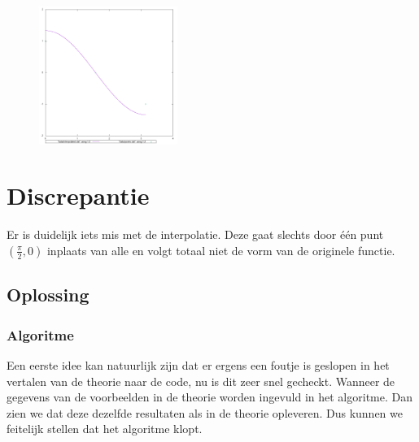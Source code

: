 \documentclass[10pt,a4paper,twocolumn]{article}
\begin{document}
\begin{figure}[H]
\includegraphics[width=0.4\textwidth]{interpolated-3}
\end{figure}
\section{Discrepantie}
Er is duidelijk iets mis met de interpolatie. Deze gaat slechts door één punt $(\frac{\pi}{2}, 0)$ inplaats van alle en volgt totaal niet de vorm van de originele functie.

\subsection{Oplossing}
\subsubsection{Algoritme}
Een eerste idee kan natuurlijk zijn dat er ergens een foutje is geslopen in het vertalen van de theorie naar de code, nu is dit zeer snel gecheckt. Wanneer de gegevens van de voorbeelden in de theorie worden ingevuld in het algoritme. Dan zien we dat deze dezelfde resultaten als in de theorie opleveren. Dus kunnen we feitelijk stellen dat het algoritme klopt.
\end{document}
